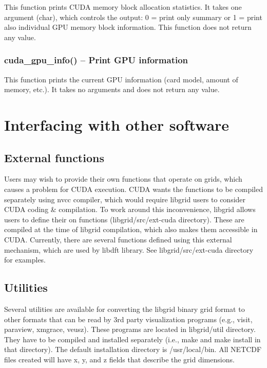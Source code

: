 \documentclass[12pt,letterpaper]{report}
\begin{document}
This function prints CUDA memory block allocation statistics. It takes one argument (char), which controls the output: 0 = print only summary or 1 = print also individual GPU memory block information. This function does not return any value.

\subsection{cuda\_gpu\_info() -- Print GPU information}

This function prints the current GPU information (card model, amount of memory, etc.). It takes no arguments and does not return any value.

\chapter{Interfacing with other software}

\section{External functions}

Users may wish to provide their own functions that operate on grids, which causes a problem for CUDA execution. CUDA wants the functions to be compiled separately using nvcc compiler, which would require libgrid users to consider CUDA coding \& compilation. To work around this inconvenience, libgrid allows users to define their on functions (libgrid/src/ext-cuda directory). These are compiled at the time of libgrid compilation, which also makes them accessible in CUDA. Currently, there are several functions defined using this external mechanism, which are used by libdft library. See libgrid/src/ext-cuda directory for examples.

\section{Utilities}

Several utilities are available for converting the libgrid binary grid format to other formats that can be read by 3rd party visualization programs (e.g., visit, paraview, xmgrace, veusz). These programs are located in libgrid/util directory. They have to be compiled and installed separately (i.e., make and make install in that directory). The default installation directory is /usr/local/bin. All NETCDF files created will have x, y, and z fields that describe the grid dimensions.
\end{document}
